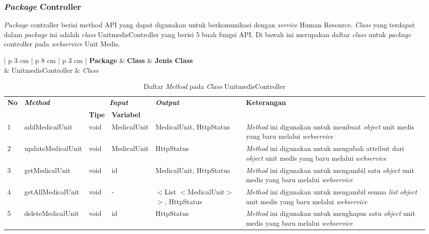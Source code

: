 \subsubsection{\textit{Package} Controller}
\textit{Package} controller berisi method API yang dapat digunakan untuk berkomunikasi dengan \textit{service} Human Resource. \textit{Class} yang terdapat dalam \textit{package} ini adalah \textit{class} UnitmedisController yang berisi 5 buah fungsi API. Di bawah ini merupakan daftar \textit{class} untuk \textit{package} controller pada \textit{webservice} Unit Medis.
\begin{table}[H]
	\small
	\centering
	\caption{Daftar {\itshape Class} pada {\itshape Package} Controller}
	\begin{adjustbox}{width=1\textwidth}
		\begin{tabular}{| p {3 cm} | p {8 cm} | p {3 cm} |}
			\hline
			{\bfseries Package} & {\bfseries Class} & {\bfseries Jenis Class} \\
			\hline
			 & UnitmedisController & {\itshape Class} \\
			\hline
		\end{tabular}
	\end{adjustbox}
\end{table}
\begin{table}[H]
	\caption{Daftar \textit{Method} pada \textit{Class} UnitmedisController}
	\centering
	\small
	\begin{adjustbox}{width=1\textwidth}	
		\begin{tabular}{|p{0.4cm}|p{2.8cm}|p{0.9cm}|p{1.8cm}|p{2.8cm}|p{2.5cm}|}
			\hline
			\multirow{2}{*}{\textbf{No}} & \multirow{2}{*}{\textit{\textbf{Method}}} & \multicolumn{2}{c|}{\textit{\textbf{Input}}} & \multirow{2}{*}{\textit{\textbf{Output}}} & 
			\multirow{2}{*}{\textbf{Keterangan}}\\
			\cline{3-4}
			& & \textbf{Tipe} & \textbf{Variabel} & & \\
			\hline
			1 & addMedicalUnit & void & MedicalUnit & MedicalUnit, HttpStatus & \textit{Method} ini digunakan untuk membuat \textit{object} unit medis yang baru melalui \textit{webservice}\\
			\hline
			2 & updateMedicalUnit & void & MedicalUnit & HttpStatus & \textit{Method} ini digunakan untuk mengubah attribut dari \textit{object} unit medis yang baru melalui \textit{webservice}\\
			\hline
			3 & getMedicalUnit & void & id & MedicalUnit, HttpStatus & \textit{Method} ini digunakan untuk mengambil satu \textit{object} unit medis yang baru melalui \textit{webservice}\\
			\hline
			4 & getAllMedicalUnit & void & - & $<$List
			$<$MedicalUnit$>$$>$, HttpStatus & \textit{Method} ini digunakan untuk mengambil semua \textit{list} \textit{object} unit medis yang baru melalui \textit{webservice}\\
			\hline
			5 & deleteMedicalUnit & void & id & HttpStatus & \textit{Method} ini digunakan untuk menghapus satu \textit{object} unit medis yang baru melalui \textit{webservice}\\
			\hline
		\end{tabular}
	\end{adjustbox}
\end{table}
